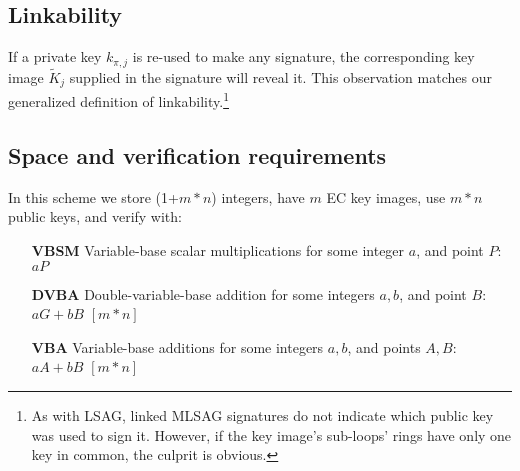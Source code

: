 \subsection*{Linkability}

If a private key \(k_{\pi, j}\) is re-used to make any signature, the corresponding key image \(\tilde{K}_j\) supplied in the signature will reveal it. This observation matches our generalized definition of linkability.\footnote{As with LSAG, linked MLSAG signatures do not indicate which public key was used to sign it. However, if the key image's sub-loops' rings have only one key in common, the culprit is obvious.}


\subsection*{Space and verification requirements}

In this scheme we store (1+$m*n$) integers, have $m$ EC key images, use $m*n$ public keys, and verify with:

\begin{itemize}
    \setlength\itemsep{\listspace}
    \item [\textbf{VBSM}] Variable-base scalar multiplications for some integer $a$, and point $P$: $a P$ \quad [m]
    \item [\textbf{DVBA}] Double-variable-base addition for some integers $a, b$, and point $B$: $a G + b B$ \quad \([m*n]\)
    \item [\textbf{VBA}] Variable-base additions for some integers $a, b$, and points $A, B$: $a A + b B$ \quad \([m*n]\)
\end{itemize}
